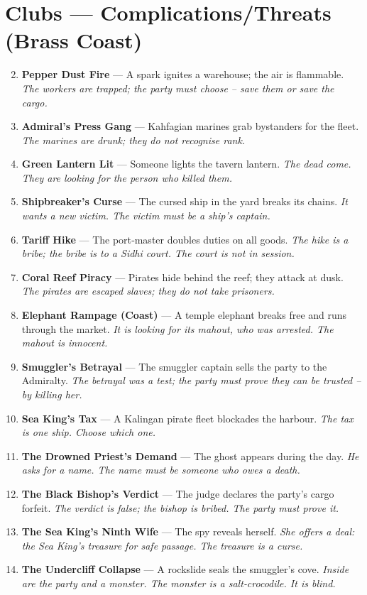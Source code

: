 \documentclass[11pt]{book}
\begin{document}
\section*{Clubs — Complications/Threats (Brass Coast)}
\begin{enumerate}
\setcounter{enumi}{1}
\item \textbf{Pepper Dust Fire} — A spark ignites a warehouse; the air is flammable. \textit{The workers are trapped; the party must choose – save them or save the cargo.}
\item \textbf{Admiral’s Press Gang} — Kahfagian marines grab bystanders for the fleet. \textit{The marines are drunk; they do not recognise rank.}
\item \textbf{Green Lantern Lit} — Someone lights the tavern lantern. \textit{The dead come. They are looking for the person who killed them.}
\item \textbf{Shipbreaker’s Curse} — The cursed ship in the yard breaks its chains. \textit{It wants a new victim. The victim must be a ship’s captain.}
\item \textbf{Tariff Hike} — The port‑master doubles duties on all goods. \textit{The hike is a bribe; the bribe is to a Sidhi court. The court is not in session.}
\item \textbf{Coral Reef Piracy} — Pirates hide behind the reef; they attack at dusk. \textit{The pirates are escaped slaves; they do not take prisoners.}
\item \textbf{Elephant Rampage (Coast)} — A temple elephant breaks free and runs through the market. \textit{It is looking for its mahout, who was arrested. The mahout is innocent.}
\item \textbf{Smuggler’s Betrayal} — The smuggler captain sells the party to the Admiralty. \textit{The betrayal was a test; the party must prove they can be trusted – by killing her.}
\item \textbf{Sea King’s Tax} — A Kalingan pirate fleet blockades the harbour. \textit{The tax is one ship. Choose which one.}
\item[J] \textbf{The Drowned Priest’s Demand} — The ghost appears during the day. \textit{He asks for a name. The name must be someone who owes a death.}
\item[Q] \textbf{The Black Bishop’s Verdict} — The judge declares the party’s cargo forfeit. \textit{The verdict is false; the bishop is bribed. The party must prove it.}
\item[K] \textbf{The Sea King’s Ninth Wife} — The spy reveals herself. \textit{She offers a deal: the Sea King’s treasure for safe passage. The treasure is a curse.}
\item[A] \textbf{The Undercliff Collapse} — A rockslide seals the smuggler’s cove. \textit{Inside are the party and a monster. The monster is a salt‑crocodile. It is blind.}
\end{enumerate}
\end{document}

